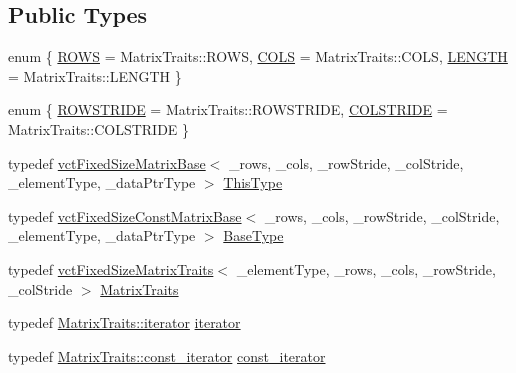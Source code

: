 \subsection*{Public Types}
\begin{DoxyCompactItemize}
\item 
enum \{ \hyperlink{classvct_fixed_size_matrix_base_a939e2f4b06ffc96c2d9d9a27dcb9fa33ab17b61dd0080412b3f116710fdfcc928}{R\+O\+W\+S} = Matrix\+Traits\+:\+:R\+O\+W\+S, 
\hyperlink{classvct_fixed_size_matrix_base_a939e2f4b06ffc96c2d9d9a27dcb9fa33a977a8d137c1cd687cca56aaea7ecf08c}{C\+O\+L\+S} = Matrix\+Traits\+:\+:C\+O\+L\+S, 
\hyperlink{classvct_fixed_size_matrix_base_a939e2f4b06ffc96c2d9d9a27dcb9fa33ac8bf7d534608f60f8196c0bf3d6a52c5}{L\+E\+N\+G\+T\+H} = Matrix\+Traits\+:\+:L\+E\+N\+G\+T\+H
 \}
\item 
enum \{ \hyperlink{classvct_fixed_size_matrix_base_a7ca4cc289d4bd697476f2d37e82e9a38a6c561939f5de9c5e815b889df7662117}{R\+O\+W\+S\+T\+R\+I\+D\+E} = Matrix\+Traits\+:\+:R\+O\+W\+S\+T\+R\+I\+D\+E, 
\hyperlink{classvct_fixed_size_matrix_base_a7ca4cc289d4bd697476f2d37e82e9a38a920a67cbcd917bab0e46677bf43cb6b8}{C\+O\+L\+S\+T\+R\+I\+D\+E} = Matrix\+Traits\+:\+:C\+O\+L\+S\+T\+R\+I\+D\+E
 \}
\item 
typedef \hyperlink{classvct_fixed_size_matrix_base}{vct\+Fixed\+Size\+Matrix\+Base}$<$ \+\_\+rows, \+\_\+cols, \+\_\+row\+Stride, \+\_\+col\+Stride, \+\_\+element\+Type, \+\_\+data\+Ptr\+Type $>$ \hyperlink{classvct_fixed_size_matrix_base_ad2d0e739023eaf4fe1a77106083eec76}{This\+Type}
\item 
typedef \hyperlink{classvct_fixed_size_const_matrix_base}{vct\+Fixed\+Size\+Const\+Matrix\+Base}$<$ \+\_\+rows, \+\_\+cols, \+\_\+row\+Stride, \+\_\+col\+Stride, \+\_\+element\+Type, \+\_\+data\+Ptr\+Type $>$ \hyperlink{classvct_fixed_size_matrix_base_af750de762d865940c9eba155b2e87b9c}{Base\+Type}
\item 
typedef \hyperlink{classvct_fixed_size_matrix_traits}{vct\+Fixed\+Size\+Matrix\+Traits}$<$ \+\_\+element\+Type, \+\_\+rows, \+\_\+cols, \+\_\+row\+Stride, \+\_\+col\+Stride $>$ \hyperlink{classvct_fixed_size_matrix_base_a6691e8d4aab2e2d733c494357ffd870a}{Matrix\+Traits}
\item 
typedef \hyperlink{classvct_fixed_size_matrix_traits_a677065481ada218e2559cdec92e97fd8}{Matrix\+Traits\+::iterator} \hyperlink{classvct_fixed_size_matrix_base_aeeeca0bc3fc21d2e48fd8e1ae2eaf836}{iterator}
\item 
typedef \hyperlink{classvct_fixed_size_matrix_traits_a8f7178fb03f45772c705fba16e08065d}{Matrix\+Traits\+::const\+\_\+iterator} \hyperlink{classvct_fixed_size_matrix_base_a53dcfd245b0c11371d50c406fa59db61}{const\+\_\+iterator}

\end{DoxyCompactItemize}

